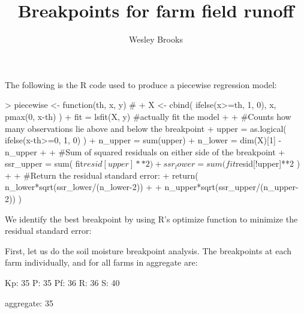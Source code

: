\documentclass[12pt]{article}
\title{Breakpoints for farm field runoff}
\author{Wesley Brooks}
\date{}                                           %
\begin{document}
\maketitle






The following is the R code used to produce a piecewise regression model:

\begin{Schunk}
\begin{Sinput}
> piecewise <- function(th, x, y) { # 
+         X <- cbind( ifelse(x>=th, 1, 0), x, pmax(0, x-th) )
+         fit = lsfit(X, y) #actually fit the model
+         
+         #Counts how many observations lie above and below the breakpoint
+         upper = as.logical( ifelse(x-th>=0, 1, 0) )
+         n_upper = sum(upper)
+         n_lower = dim(X)[1] - n_upper
+         
+         #Sum of squared residuals on either side of the breakpoint
+         ssr_upper = sum( fit$resid[upper]**2 )
+         ssr_lower = sum( fit$resid[!upper]**2 )
+         
+         #Return the residual standard error:
+         return( n_lower*sqrt(ssr_lower/(n_lower-2)) 
+             + n_upper*sqrt(ssr_upper/(n_upper-2)) ) }
\end{Sinput}
\end{Schunk}


\vspace{10mm}
We identify the best breakpoint by using R's optimize function to minimize the residual standard error:

\begin{Schunk}
\end{Schunk}



\vspace{10mm}
First, let us do the soil moisture breakpoint analysis. The breakpoints at each farm individually, and for all farms in aggregate are:


\begin{Schunk}
\begin{Soutput}
Kp: 35
P: 35
Pf: 36
R: 36
S: 40
\end{Soutput}
\begin{Soutput}
aggregate: 35
\end{Soutput}
\end{Schunk}
\end{document}
